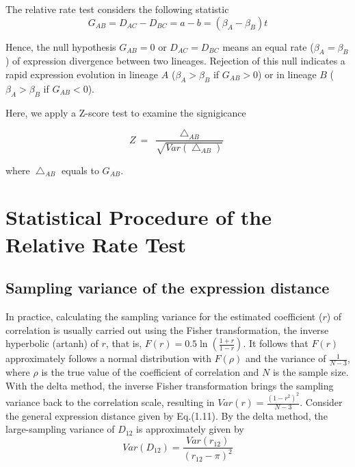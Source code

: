 \documentclass[]{book}
\begin{document}
The relative rate test considers the following statistic
\[G_{AB}=D_{AC}-D_{BC}=a-b=\left(\beta_A-\beta_B\right)t\tag{2.2}\]

Hence, the null hypothesis \(G_{AB}=0\) or \(D_{AC}=D_{BC}\) means an equal rate (\(\beta_A=\beta_B\)) of expression divergence between two lineages. Rejection of this null indicates a rapid expression evolution in lineage \(A\) (\(\beta_A>\beta_B\) if \(G_{AB}>0\)) or in lineage \(B\) (\(\beta_A>\beta_B\) if \(G_{AB}<0\)).

Here, we apply a Z-score test to examine the signigicance

\[Z\  =\  \frac{\bigtriangleup_{AB}}{\sqrt{Var\left(\bigtriangleup_{AB}\right)}}\tag{2.3}\]

where \(\bigtriangleup_{AB}\) equals to \(G_{AB}\).

\newpage

\hypertarget{statistical-procedure-of-the-relative-rate-test}{%
\section{Statistical Procedure of the Relative Rate Test}\label{statistical-procedure-of-the-relative-rate-test}}

\hypertarget{sampling-variance-of-the-expression-distance}{%
\subsection{Sampling variance of the expression distance}\label{sampling-variance-of-the-expression-distance}}

In practice, calculating the sampling variance for the estimated coefficient (\(r\)) of correlation is usually carried out using the Fisher transformation, the inverse hyperbolic (artanh) of \(r\), that is, \(F\left(r\right)=0.5\ln\left(\frac{1+r}{1-r}\right)\). It follows that \(F(r)\) approximately follows a normal distribution with \(F(\rho)\) and the variance of \(\frac{1}{N-3}\), where \(\rho\) is the true value of the coefficient of correlation and \(N\) is the sample size. With the delta method, the inverse Fisher transformation brings the sampling variance back to the correlation scale, resulting in \(Var\left(r\right)=\frac{\left(1-r^2\right)^2}{N-3}\). Consider the general expression distance given by Eq.(1.11). By the delta method, the large-sampling variance of \(D_{12}\) is approximately given by
\[Var\left(D_{12}\right)=\frac{Var\left(r_{12}\right)}{\left(r_{12}-\pi\right)^2}\tag{2.4}\]
\end{document}
